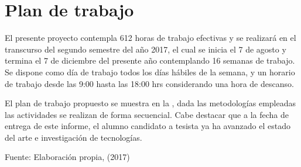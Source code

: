 \chapter{Plan de trabajo}
\label{ch:plan_trabajo}

El presente proyecto contempla 612 horas de trabajo efectivas y se realizará en el transcurso del segundo semestre del año 2017, el cual se inicia el 7 de agosto y termina el 7 de diciembre del presente año contemplando 16 semanas de trabajo. Se dispone como día de trabajo todos los días hábiles de la semana, y un horario de trabajo desde las 9:00 hasta las 18:00 hrs considerando una hora de descanso.

El plan de trabajo propuesto se muestra en la , dada las metodologías empleadas las actividades se realizan de forma secuencial. Cabe destacar que a la fecha de entrega de este informe, el alumno candidato a tesista ya ha avanzado el estado del arte e investigación de tecnologías.

\begin{table}[htb]
  \centering
    \label{tab:plan}
    \medskip
    \par\centering Fuente: Elaboración propia, (2017)
\end{table}

